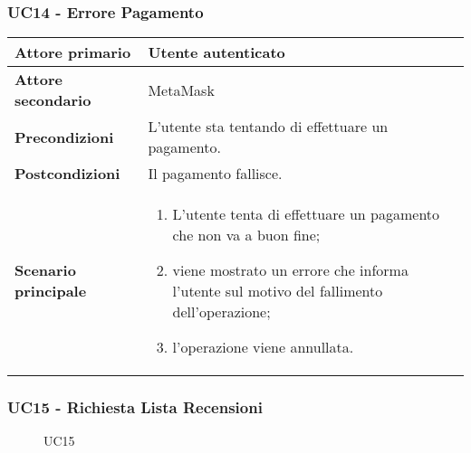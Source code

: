 \subsubsection{UC14 - Errore Pagamento}
\label{UC14}
\begin{center}
\renewcommand{\arraystretch}{1.5}
\begin{tabular}{ | m{10em} | m{20em} | }
    \hline
    \textbf{Attore primario} & Utente autenticato \\
    \hline
    \textbf{Attore secondario} & MetaMask \\
    \hline
    \textbf{Precondizioni} & L'utente sta tentando di effettuare un pagamento. \\
    \hline
    \textbf{Postcondizioni} & Il pagamento fallisce. \\
    \hline
    \textbf{Scenario principale} & \begin{enumerate}
        \item L'utente tenta di effettuare un pagamento che non va a buon fine;
        \item viene mostrato un errore che informa l'utente sul motivo del fallimento
              dell'operazione;
        \item l'operazione viene annullata.
    \end{enumerate} \\
    \hline
   \end{tabular}
\end{center}

\subsubsection{UC15 - Richiesta Lista Recensioni}
\label{UC15}

\begin{figure}[H]
    \centering
    
    \caption{UC15}
 \end{figure}

